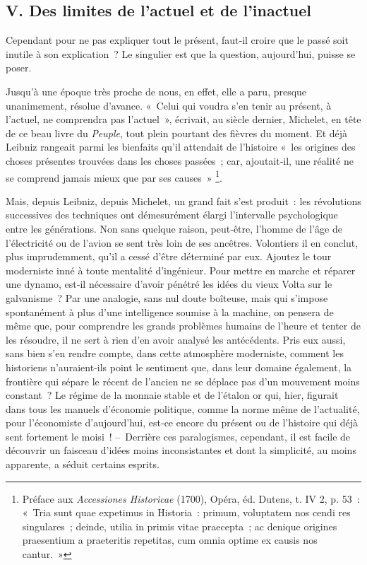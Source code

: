 \documentclass[french,twoside]{book} %
\begin{document}
\subsection[{V. Des limites de l’actuel et de l’inactuel}]{V. Des limites de l’actuel et de l’inactuel}
\noindent Cependant pour ne pas expliquer tout le présent, faut‑il croire que le passé soit inutile à son explication ? Le singulier est que la question, aujourd’hui, puisse se poser.\par
Jusqu’à une époque très proche de nous, en effet, elle a paru, presque unanimement, résolue d’avance. « Celui qui voudra s’en tenir au présent, à l’actuel, ne comprendra pas l’actuel », écrivait, au siècle dernier, Michelet, en tête de ce beau livre du \emph{Peuple}, tout plein pourtant des fièvres du moment. Et déjà Leibniz rangeait parmi les bienfaits qu’il attendait de l’histoire « les origines des choses présentes trouvées dans les choses passées ; car, ajoutait‑il, une réalité ne se comprend jamais mieux que par ses causes » \footnote{Préface aux \emph{Accessiones Historicae} (1700), Opéra, éd. Dutens, t. IV 2, p. 53 : « Tria sunt quae expetimus in Historia : primum, voluptatem nos cendi res sin­gulares ; deinde, utilia in primis vitae praecepta ; ac denique origines praesentium a praeteritis repetitas, cum omnia optime ex causis nos cantur. »}.\par
Mais, depuis Leibniz, depuis Michelet, un grand fait s’est produit : les révolutions successives des techniques ont démesurément élargi l’in­tervalle psychologique entre les générations. Non sans quelque raison, peut‑être, l’homme de l’âge de l’électricité ou de l’avion se sent très loin de ses ancêtres. Volontiers il en conclut, plus imprudemment, qu’il a cessé d’être déterminé par eux. Ajoutez le tour moderniste inné à toute mentalité d’ingénieur. Pour mettre en marche et réparer une dynamo, est‑il nécessaire d’avoir pénétré les idées du vieux Volta sur le galvanisme ? Par une analogie, sans nul doute boîteuse, mais qui s’impose spontanément à plus d’une intelligence soumise à la machine, on pensera de même que, pour comprendre les grands problèmes humains de l’heure et tenter de les résoudre, il ne sert à rien d’en avoir analysé les antécédents. Pris eux aussi, sans bien s’en rendre compte, dans cette atmosphère moderniste, comment les historiens n’auraient‑ils point le sentiment que, dans leur domaine également, la frontière qui sépare le récent de l’ancien ne se déplace pas d’un mouvement moins constant ? Le régime de la monnaie stable et de l’étalon or qui, hier, figurait dans tous les manuels d’économie politique, comme la norme même de l’actualité, pour l’éco­nomiste d’aujourd’hui, est‑ce encore du présent ou de l’histoire qui déjà  
\label{p10} sent fortement le moisi ! – Derrière ces paralogismes, cependant, il est facile de découvrir un faisceau d’idées moins inconsistantes et dont la simpli­cité, au moins apparente, a séduit certains esprits.\par
\end{document}
